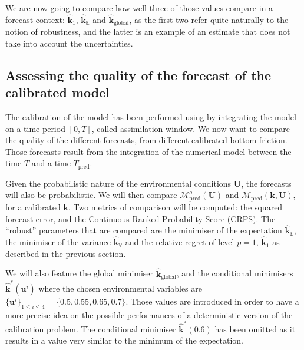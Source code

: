 \documentclass[preprint, 1p]{elsarticle}
\newcommand{\Ex}{\mathbb{E}}
\newcommand{\hatkmean}{\hat{\mathbf{k}}_{\Ex}}
\newcommand{\hatkvar}{\hat{\mathbf{k}}_{\mathbb{V}}}
\newcommand{\kest}{\hat{\mathbf{k}}}
\begin{document}
We are now going to compare how well three of those values compare in a forecast context: $\kest_1$, $\hatkmean$ and $\kest_{\mathrm{global}}$, as the first two refer quite naturally to the notion of robustness, and the latter is an example of an estimate that does not take into account the uncertainties.

\subsection{Assessing the quality of the forecast of the calibrated model}
The calibration of the model has been performed using by integrating the model on a time-period $[0, T]$, called assimilation window. 
We now want to compare the quality of the different forecasts, from different calibrated bottom friction.
Those forecasts result from the integration of the numerical model between the time $T$ and a time $T_{\mathrm{pred}}$.

Given the probabilistic nature of the environmental conditions $\mathbf{U}$, the forecasts will also be probabilistic. We will then compare $\mathcal{M}_{\mathrm{pred}}^o(\mathbf{U})$ and $\mathcal{M}_{\mathrm{pred}}(\mathbf{k},\mathbf{U})$, for a calibrated $\mathbf{k}$. Two metrics of comparison will be computed: the squared forecast error, and the Continuous Ranked Probability Score (CRPS). The ``robust'' parameters that are compared are the minimiser of the expectation $\hatkmean$, the minimiser of the variance $\hatkvar$ and the relative regret of level $p=1$, $\kest_1$ as described in the previous section.

We will also feature the global minimiser $\kest_{\mathrm{global}}$, and the conditional minimisers $\kest^*(\mathbf{u}^i)$ where the chosen environmental variables are $\{\mathbf{u}^i\}_{1\leq i \leq 4} = \{0.5, 0.55, 0.65, 0.7\}$. Those values are introduced in order to have a more precise idea on the possible performances of a deterministic version of the calibration problem.
The conditional minimiser $\kest^*(0.6)$ has been omitted as it results in a value very similar to the minimum of the expectation.
\end{document}
